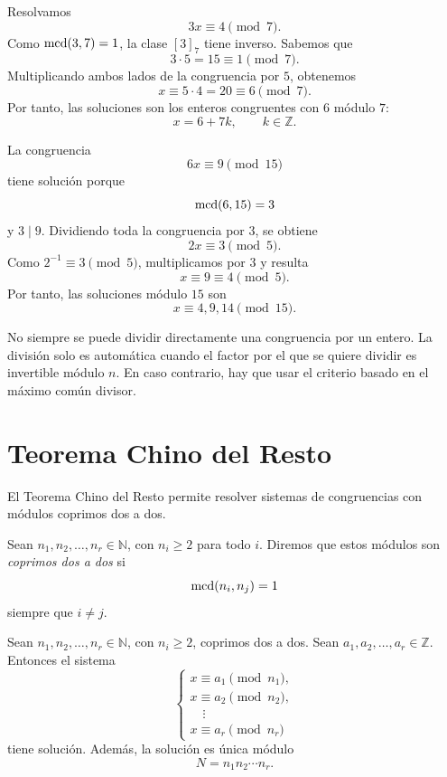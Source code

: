 \begin{ejemplo}
Resolvamos
\[
  3x\equiv 4\pmod 7.
\]
Como \(\operatorname{mcd}(3,7)=1\), la clase \([3]_7\) tiene inverso. Sabemos que
\[
  3\cdot 5=15\equiv 1\pmod 7.
\]
Multiplicando ambos lados de la congruencia por \(5\), obtenemos
\[
  x\equiv 5\cdot 4=20\equiv 6\pmod 7.
\]
Por tanto, las soluciones son los enteros congruentes con \(6\) módulo \(7\):
\[
  x=6+7k, \qquad k\in\mathbb{Z}.
\]
\end{ejemplo}

\begin{ejemplo}
La congruencia
\[
  6x\equiv 9\pmod{15}
\]
tiene solución porque
\[
  \operatorname{mcd}(6,15)=3
\]
y \(3\mid 9\). Dividiendo toda la congruencia por \(3\), se obtiene
\[
  2x\equiv 3\pmod 5.
\]
Como \(2^{-1}\equiv 3\pmod 5\), multiplicamos por \(3\) y resulta
\[
  x\equiv 9\equiv 4\pmod 5.
\]
Por tanto, las soluciones módulo \(15\) son
\[
  x\equiv 4,9,14\pmod{15}.
\]
\end{ejemplo}

\begin{advertencia}
No siempre se puede dividir directamente una congruencia por un entero. La división solo es automática cuando el factor por el que se quiere dividir es invertible módulo \(n\). En caso contrario, hay que usar el criterio basado en el máximo común divisor.
\end{advertencia}

\section{Teorema Chino del Resto}

El Teorema Chino del Resto permite resolver sistemas de congruencias con módulos coprimos dos a dos.

\begin{definicion}
Sean \(n_1,n_2,\ldots,n_r\in\mathbb{N}\), con \(n_i\geq 2\) para todo \(i\). Diremos que estos módulos son \emph{coprimos dos a dos} si
\[
  \operatorname{mcd}(n_i,n_j)=1
\]
siempre que \(i\neq j\).
\end{definicion}

\begin{teorema}
Sean \(n_1,n_2,\ldots,n_r\in\mathbb{N}\), con \(n_i\geq 2\), coprimos dos a dos. Sean \(a_1,a_2,\ldots,a_r\in\mathbb{Z}\). Entonces el sistema
\[
\begin{cases}
  x\equiv a_1 \pmod{n_1},\\
  x\equiv a_2 \pmod{n_2},\\
  \quad\vdots\\
  x\equiv a_r \pmod{n_r}
\end{cases}
\]
tiene solución. Además, la solución es única módulo
\[
  N=n_1n_2\cdots n_r.
\]
\end{teorema}

